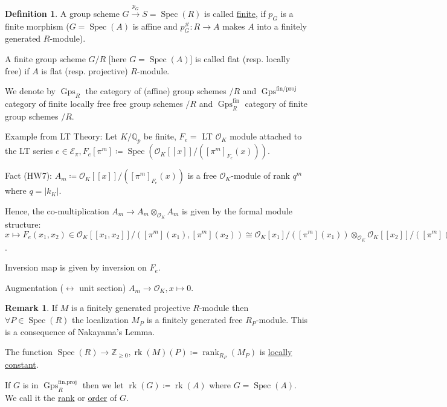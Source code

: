 \documentclass{article}
\theoremstyle{definition}
\newtheorem*{definition}{Definition}
\numberwithin{theorem}{subsection}
\newtheorem*{remark}{Remark}
\begin{document}
    \begin{definition}
        A group scheme \(G \xrightarrow{p_G} S = \operatorname{Spec}(R)\) is called \underline{finite}, if \(p_G\) is a finite morphism (\(G = \operatorname{Spec}(A)\) is affine and \(p_G^\#: R \to A\) makes \(A\) into a finitely generated \(R\)-module).

        A finite group scheme \(G / R\) [here \(G = \operatorname{Spec}(A)\)] is called flat (resp. locally free) if \(A\) is flat (resp. projective) \(R\)-module.

        We denote by \(\operatorname{Gps}_R\) the category of (affine) group schemes \(/R\) and \(\operatorname{Gps}^{\text{fin/proj}}\) category of finite locally free free group schemes \(/ R\) and \(\operatorname{Gps}_R^{\operatorname{fin}}\) category of finite group schemes \(/ R\).
    
    \end{definition}

    Example from LT Theory: Let \(K / \mathbb{Q}_p\) be finite, \(F_e =\) LT \(\mathcal{O}_K\) module attached to the LT series \(e\in \mathscr{E}_\pi, F_e[\pi^m]\coloneqq \operatorname{Spec}(\mathcal{O}_K[[x]] / ([\pi^m]_{F_e}(x)))\).

    Fact (HW7): \(A_m \coloneqq \mathcal{O}_K[[x]] / ([\pi^m]_{F_e}(x))\) is a free \(\mathcal{O}_K\)-module of rank \(q^m\) where \(q = \vert k_K \vert\). 

    Hence, the co-multiplication \(A_m \to A_m \otimes_{\mathcal{O}_K} A_m\) is given by the formal module structure: \(x \mapsto F_e(x_1, x_2) \in \mathcal{O}_K[[x_1,x_2]] / ([\pi^m](x_1),[\pi^m](x_2)) \cong \mathcal{O}_K[x_1] / ([\pi^m](x_1)) \otimes_{\mathcal{O}_K} \mathcal{O}_K[[x_2]] / ([\pi^m](x_2))\).

    Inversion map is given by inversion on \(F_e\).

    Augmentation (\(\leftrightarrow\) unit section) \(A_m \to \mathcal{O}_K, x \mapsto 0\).
    
    \begin{remark}
        If \(M\) is a finitely generated projective \(R\)-module then \(\forall P \in \operatorname{Spec}(R)\) the localization \(M_P\) is a finitely generated free \(R_P\)-module. This is a consequence of Nakayama's Lemma.
        
        The function \(\operatorname{Spec}(R) \to \mathbb{Z}_{\geq 0}, \operatorname{rk}(M)(P)\coloneqq \operatorname{rank}_{R_P}(M_P)\) is \underline{locally constant}.
        
        If \(G\) is in \(\operatorname{Gps}_R^{\operatorname{fin,proj}}\) then we let \(\operatorname{rk}(G) \coloneqq \operatorname{rk}(A)\) where \(G=\operatorname{Spec}(A)\). We call it the \underline{rank} or \underline{order} of \(G\).
        
    \end{remark}
\end{document}
